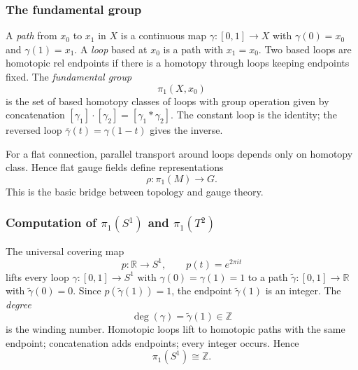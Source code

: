 \subsubsection{The fundamental group}

A \emph{path} from $x_0$ to $x_1$ in $X$ is a continuous map $\gamma : [0,1] \to X$ with $\gamma(0)=x_0$ and $\gamma(1)=x_1$. A \emph{loop} based at $x_0$ is a path with $x_1=x_0$. Two based loops are homotopic rel endpoints if there is a homotopy through loops keeping endpoints fixed. The \emph{fundamental group}
\begin{equation}
  \pi_1(X,x_0)
\end{equation}
is the set of based homotopy classes of loops with group operation given by concatenation $[\gamma_1] \cdot [\gamma_2] = [\gamma_1 * \gamma_2]$. The constant loop is the identity; the reversed loop $\overline\gamma(t)=\gamma(1-t)$ gives the inverse.

For a flat connection, parallel transport around loops depends only on homotopy class. Hence flat gauge fields define representations
\begin{equation}
  \rho : \pi_1(M) \to G.
\end{equation}
This is the basic bridge between topology and gauge theory.

\subsubsection{\texorpdfstring{Computation of $\pi_1(S^1)$ and $\pi_1(T^2)$}{Computation of pi1(S1) and pi1(T2)}}

The universal covering map
\begin{equation}
  p : \mathbb{R} \to S^1,
  \qquad
  p(t)=e^{2\pi i t}
\end{equation}
lifts every loop $\gamma : [0,1] \to S^1$ with $\gamma(0)=\gamma(1)=1$ to a path $\widetilde\gamma : [0,1] \to \mathbb{R}$ with $\widetilde\gamma(0)=0$. Since $p(\widetilde\gamma(1))=1$, the endpoint $\widetilde\gamma(1)$ is an integer. The \emph{degree}
\begin{equation}
  \deg(\gamma)=\widetilde\gamma(1) \in \mathbb{Z}
\end{equation}
is the winding number. Homotopic loops lift to homotopic paths with the same endpoint; concatenation adds endpoints; every integer occurs. Hence
\begin{equation}
  \pi_1(S^1) \cong \mathbb{Z}.
\end{equation}


